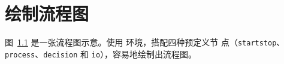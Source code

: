 
\chapter{绘制流程图}

图~\ref{fig:flow_chart} 是一张流程图示意。使用  环境，搭配四种预定义节
点（\verb|startstop|、\verb|process|、\verb|decision| 和 \verb|io|），容易地绘制出流程图。

\begin{figure}[!htp]
  \centering
  
  \label{fig:flow_chart}
\end{figure}
